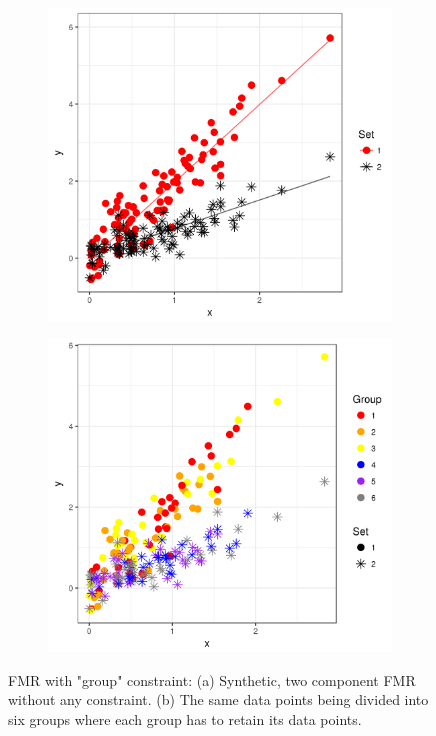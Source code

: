 \documentclass[12pt]{article}
\begin{document}
\begin{figure}[ht]
\begin{subfigure}{.5\textwidth}
\centering
\includegraphics[width=1\linewidth]{fmr.png}
\caption{\footnotesize{}}\label{fig:sfig1}
\end{subfigure}
\begin{subfigure}{.5\textwidth}
\centering
\includegraphics[width=1\linewidth, scale = 0.7]{fmr_const.png}

\caption{\footnotesize{}}\label{fig:sfig2}
\end{subfigure}
\caption{FMR with "group" constraint: (a) Synthetic, two component FMR without any constraint. (b) The same data points being divided into six groups where each group has to retain its data points.}\label{fig:fig1}
\end{figure}
\end{document}
